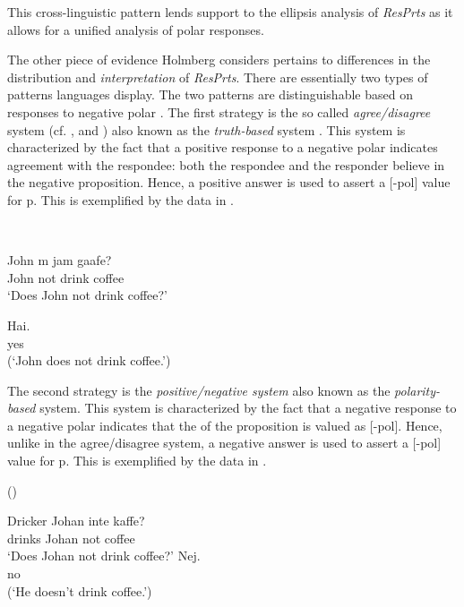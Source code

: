 \documentclass[output=paper]{LSP/langsci}
\begin{document}
This cross-linguistic pattern lends support to the ellipsis analysis of \textit{ResPrts} as it allows for a unified analysis of polar responses. 

The other piece of evidence Holmberg considers pertains to differences in the distribution and \textit{interpretation} of \textit{ResPrts}. There are essentially two types of patterns languages display. The two patterns are distinguishable based on responses to negative polar . The first strategy is the so called \textit{agree/disagree} system (cf.
\citealt{Kuno1973,Pope1976}, and  \citealt{SadockZwicky1985}) also known as the \textit{truth-based} system \citep{Jones1999}. This system is characterized by the fact that a positive response to a negative polar  indicates agreement with the respondee: both the respondee and the responder believe in the negative proposition. Hence, a positive answer is used to assert a [-pol] value for p. This is exemplified by the  data in . 

\ea\label{ex:wiltschko:9}
\\
\begin{xlist}
\gll John m jam gaafe?\\
John not drink coffee\\
\glt ‘Does John not drink coffee?’ 

\gll Hai.\\
yes\\
\glt (‘John does not drink coffee.’)
\end{xlist}\z

The second strategy is the \textit{positive/negative system} also known as the \textit{polarity-based} system. This system is characterized by the fact that a negative response to a negative polar  indicates that the  of the proposition is valued as [-pol]. Hence, unlike in the agree/disagree system, a negative answer is used to assert a [-pol] value for p. This is exemplified by the  data in .

\ea\label{ex:wiltschko:10}
 (\citealt[4 (10)]{holmberg:15})\\
\begin{xlist}
\gll Dricker Johan inte kaffe?\\
drinks Johan not coffee \\
\glt ‘Does Johan not drink coffee?’
\gll Nej. \\
no \\
\glt (‘He doesn’t drink coffee.’)
\end{xlist}\z
\end{document}
